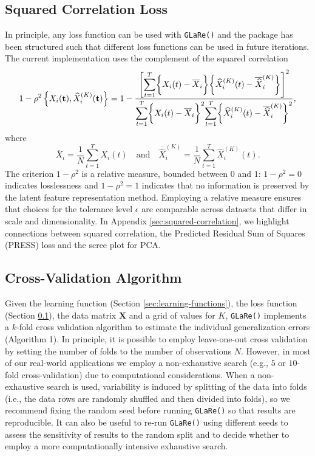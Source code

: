 \subsection{Squared Correlation Loss}\label{sec:loss-functions}

In principle, any loss function can be used with \texttt{GLaRe()} and the package has been structured such that different loss functions can be used in future iterations.
The current implementation uses the complement of the squared correlation
$$
1- \rho^2 \left\{X_i (\mathbf{t}), \widehat{X}^{(K)}_{i} (\mathbf{t}) \right\} =
1 - \frac{\left[ \mathlarger{\sum}_{t = 1}^T{\bigg\{X_i (t) - \overline{X}_i \bigg\} \bigg\{ \widehat{X}_i^{(K)} (t) - \overline{\widehat{X}}_i^{(K)} \bigg\}} \right]^2}{\mathlarger{\sum}_{t = 1}^T \bigg\{X_i (t) - \overline{X}_i \bigg\}^2 \mathlarger{\sum}_{t = 1}^T \bigg\{ \widehat{X}_i^{(K)} (t) - \overline{\widehat{X}}_i^{(K)} \bigg\} ^2},
$$
where
$$
\overline{X}_i = \frac{1}{N} \sum_{t=1}^T X_i (t) \quad \text{and} \quad \overline{\widehat{X}}_i^{(K)} = \frac{1}{N} \sum_{t=1}^T \widehat{X}_i^{(K)} (t).
$$
The criterion $1- \rho^2$ is a relative measure, bounded between $0$ and $1$: $1- \rho^2 = 0$ indicates losslessness and $1- \rho^2 = 1$ indicates that no information is preserved by the latent feature representation method.
Employing a relative measure ensures that choices for the tolerance level $\epsilon$ are comparable across datasets that differ in scale and dimensionality.
In Appendix \ref{sec:squared-correlation}, we highlight connections between squared correlation, the Predicted Residual Sum of Squares (PRESS) loss and the scree plot for PCA.

\subsection{Cross-Validation Algorithm}

Given the learning function (Section \ref{sec:learning-functions}), the loss function (Section \ref{sec:loss-functions}), the data matrix $\mathbf{X}$ and a grid of values for $K$, \texttt{GLaRe()} implements a $k$-fold cross validation algorithm to estimate the individual generalization errors (Algorithm 1).
In principle, it is possible to employ leave-one-out cross validation by setting the number of folds to the number of observations $N$.
However, in most of our real-world applications we employ a non-exhaustive search (e.g., $5$ or $10$-fold cross-validation) due to computational considerations.
When a non-exhaustive search is used, variability is induced by splitting of the data into folds (i.e., the data rows are randomly shuffled and then divided into folds), so we recommend fixing the random seed before running \texttt{GLaRe()} so that results are reproducible.
It can also be useful to re-run \texttt{GLaRe()} using different seeds to assess the sensitivity of results to the random split and to decide whether to employ a more computationally intensive exhaustive search.

